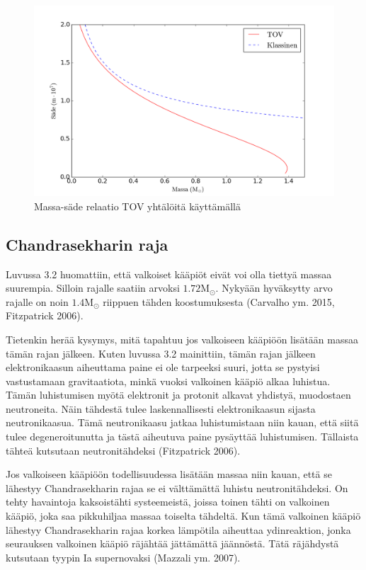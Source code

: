 \documentclass[12pt,a4paper,titlepage]{article}
\begin{document}
\begin{figure}[H]
\centering
\includegraphics[width=\textwidth]{mr2.png}
\caption{Massa-säde relaatio TOV yhtälöitä käyttämällä}
\label{pic:2}
\end{figure}

\subsection{Chandrasekharin raja}
Luvussa 3.2 huomattiin, että valkoiset kääpiöt eivät voi olla tiettyä massaa suurempia. Silloin rajalle saatiin arvoksi $1.72 \mathrm{M}_{\odot}$. Nykyään hyväksytty arvo rajalle on noin $1.4 \mathrm{M}_{\odot}$ riippuen tähden koostumuksesta (Carvalho ym. 2015, Fitzpatrick 2006). 

Tietenkin herää kysymys, mitä tapahtuu jos valkoiseen kääpiöön lisätään massaa tämän rajan jälkeen. Kuten luvussa 3.2 mainittiin, tämän rajan jälkeen elektronikaasun aiheuttama paine ei ole tarpeeksi suuri, jotta se pystyisi vastustamaan gravitaatiota, minkä vuoksi valkoinen kääpiö alkaa luhistua. Tämän luhistumisen myötä elektronit ja protonit alkavat yhdistyä, muodostaen neutroneita. Näin tähdestä tulee laskennallisesti elektronikaasun sijasta neutronikaasua. Tämä neutronikaasu jatkaa luhistumistaan niin kauan, että siitä tulee degeneroitunutta ja tästä aiheutuva paine pysäyttää luhistumisen. Tällaista tähteä kutsutaan neutronitähdeksi (Fitzpatrick 2006).

Jos valkoiseen kääpiöön todellisuudessa lisätään massaa niin kauan, että se lähestyy Chandrasekharin rajaa se ei välttämättä luhistu neutronitähdeksi. On tehty havaintoja kaksoistähti systeemeistä, joissa toinen tähti on valkoinen kääpiö, joka saa pikkuhiljaa massaa toiselta tähdeltä. Kun tämä valkoinen kääpiö lähestyy Chandrasekharin rajaa korkea lämpötila aiheuttaa ydinreaktion, jonka seurauksen valkoinen kääpiö räjähtää jättämättä jäännöstä. Tätä räjähdystä kutsutaan tyypin Ia supernovaksi (Mazzali ym. 2007). \\
\end{document}
